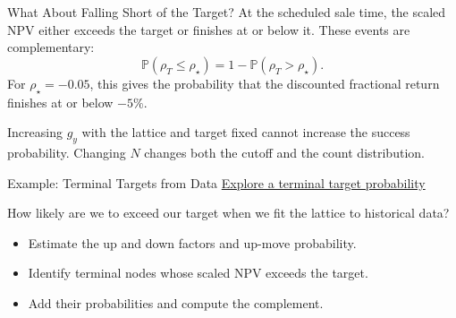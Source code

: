 \documentclass[aspectratio=169,11pt]{beamer}
\newcommand{\Pmeasure}{\mathbb{P}}
\begin{document}
\begin{frame}{What About Falling Short of the Target?}
At the scheduled sale time, the scaled NPV either exceeds the target or
  finishes at or below it. These events are complementary:
  \[
    \Pmeasure(\rho_T\le\rho_\star)=1-\Pmeasure(\rho_T>\rho_\star).
  \]
  For $\rho_\star=-0.05$, this gives the probability that the discounted
  fractional return finishes at or below $-5\%$.

  \vspace{0.6em}
  Increasing $g_y$ with the lattice and target fixed cannot increase the success
  probability. Changing $N$ changes both the cutoff and the count distribution.

\end{frame}

\begin{frame}{Example: Terminal Targets from Data}
\textbf{}
  \href{https://github.com/varnerlab/CHEME-5660-CourseRepository-Fall-2026/blob/main/lectures/week-4/L4a/CHEME-5660-L4a-Example-CumulativeProbabilityLattice-Fall-2026.ipynb}{Explore a terminal target probability}

  \vspace{0.7em}
  How likely are we to exceed our target when we fit the lattice to historical data?

  \vspace{0.5em}
  \begin{itemize}\setlength{\itemsep}{0.6em}
    \item Estimate the up and down factors and up-move probability.
    \item Identify terminal nodes whose scaled NPV exceeds the target.
    \item Add their probabilities and compute the complement.
  \end{itemize}

\end{frame}
\end{document}
